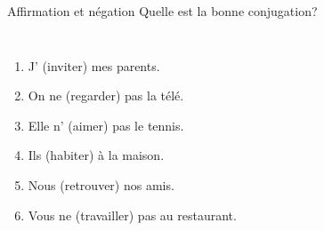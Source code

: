 \begin{frame}{Affirmation et négation}
  Quelle est la bonne conjugation? \\
  \begin{columns}
      \begin{enumerate}
        \item J'\underline{} (inviter) mes parents.
        \item On ne \underline{} (regarder) pas la télé.
        \item Elle n'\underline{} (aimer) pas le tennis.
        \item Ils \underline{} (habiter) à la maison.
        \item Nous \underline{} (retrouver) nos amis.
        \item Vous ne \underline{} (travailler) pas au restaurant.
      \end{enumerate}
      \begin{minipage}[c][0.6\textheight]{\linewidth}
        \begin{center}
        \end{center}
      \end{minipage}
  \end{columns}
\end{frame}